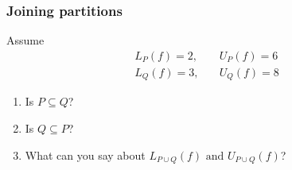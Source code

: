 \begin{frame}[t]
	\frametitle{Joining partitions}

	Assume
	\begin{align*}
		L_{P}(f)=2, & \quad U_{P}(f)=6 \\
		L_{Q}(f)=3, & \quad U_{Q}(f)=8
	\end{align*}

	\begin{enumerate}
		\item Is $\displaystyle P \subseteq Q$?

		\item Is $\displaystyle Q \subseteq P$?

		\item What can you say about $\displaystyle L_{P \cup Q}(f) \text{ and }U_{P
			\cup Q}(f)$?
	\end{enumerate}
\end{frame}

